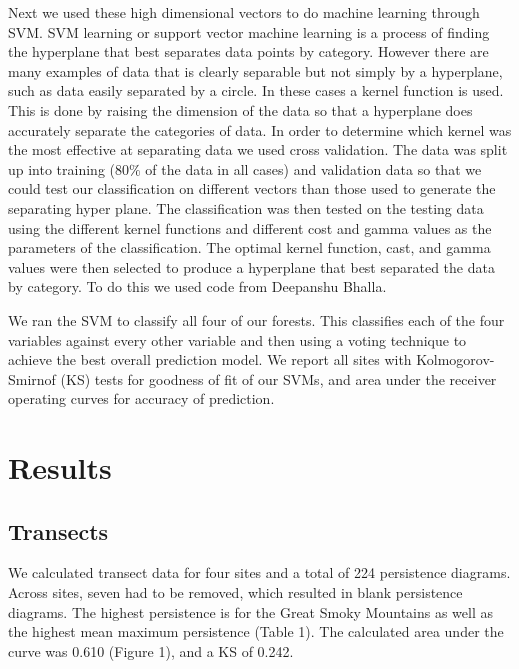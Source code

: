 \documentclass[10pt]{article}
\begin{document}
\indent Next we used these high dimensional vectors to do machine learning through SVM. SVM learning or support vector machine learning is a process of finding the hyperplane that best separates data points by category. However there are many examples of data that is clearly separable but not simply by a hyperplane, such as data easily separated by a circle. In these cases a kernel function is used. This is done by raising the dimension of the data so that a hyperplane does accurately separate the categories of data. In order to determine which kernel was the most effective at separating data we used cross validation. The data was split up into training ($80\%$ of the data in all cases) and validation data so that we could test our classification on different vectors than those used to generate the separating hyper plane. The classification was then tested on the testing data using the different kernel functions and different cost and gamma values as the parameters of the classification. The optimal kernel function, cast, and gamma values were then selected to produce a hyperplane that best separated the data by category. To do this we used code from Deepanshu Bhalla.

\indent We ran the SVM to classify all four of our forests. This classifies each of the four variables against every other variable and then using a voting technique to achieve the best overall prediction model. We report all sites with Kolmogorov-Smirnof (KS) tests for goodness of fit of our SVMs, and area under the receiver operating curves for accuracy of prediction.

\section*{Results}
\subsection*{Transects}

We calculated transect data for four sites and a total of 224 persistence diagrams. Across sites, seven had to be removed, which resulted in blank persistence diagrams. The highest persistence is for the Great Smoky Mountains as well as the highest mean maximum persistence (Table 1). The calculated area under the curve was 0.610 (Figure 1), and a KS of 0.242.\\
\end{document}
